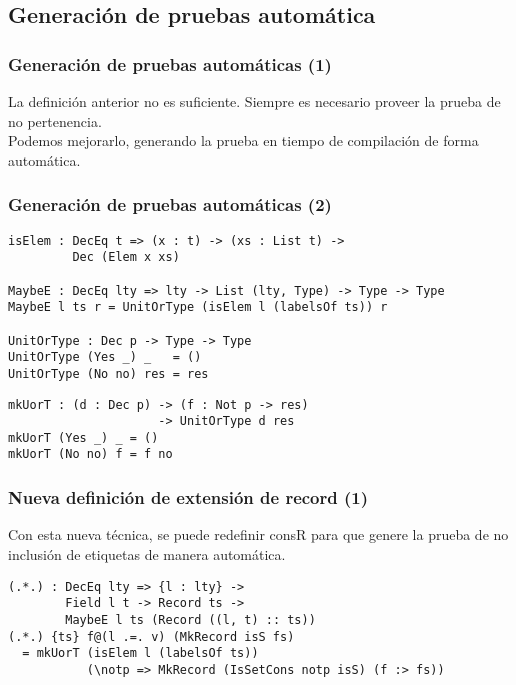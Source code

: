 \documentclass{beamer}
\begin{document}
\subsection{Generación de pruebas automática}

\begin{frame}[fragile]
\frametitle{Generación de pruebas automáticas (1)}

La definición anterior no es suficiente. Siempre es necesario proveer la prueba de no pertenencia. \\

Podemos mejorarlo, generando la prueba en tiempo de compilación de forma automática.

\end{frame}

\begin{frame}[fragile]
\frametitle{Generación de pruebas automáticas (2)}

\begin{example}
\begin{verbatim}
isElem : DecEq t => (x : t) -> (xs : List t) -> 
         Dec (Elem x xs)

MaybeE : DecEq lty => lty -> List (lty, Type) -> Type -> Type
MaybeE l ts r = UnitOrType (isElem l (labelsOf ts)) r

UnitOrType : Dec p -> Type -> Type
UnitOrType (Yes _) _   = ()
UnitOrType (No no) res = res
\end{verbatim}
\end{example}

\begin{example}
\begin{verbatim}
mkUorT : (d : Dec p) -> (f : Not p -> res)
                     -> UnitOrType d res
mkUorT (Yes _) _ = ()
mkUorT (No no) f = f no
\end{verbatim}
\end{example}

\end{frame}

\begin{frame}[fragile]
\frametitle{Nueva definición de extensión de record (1)}

Con esta nueva técnica, se puede redefinir consR para que genere la prueba de no inclusión de etiquetas de manera automática.

\pause

\begin{example}
\begin{verbatim}
(.*.) : DecEq lty => {l : lty} ->
        Field l t -> Record ts ->
        MaybeE l ts (Record ((l, t) :: ts))
(.*.) {ts} f@(l .=. v) (MkRecord isS fs)
  = mkUorT (isElem l (labelsOf ts))
           (\notp => MkRecord (IsSetCons notp isS) (f :> fs))
\end{verbatim}
\end{example}

\end{frame}
\end{document}
